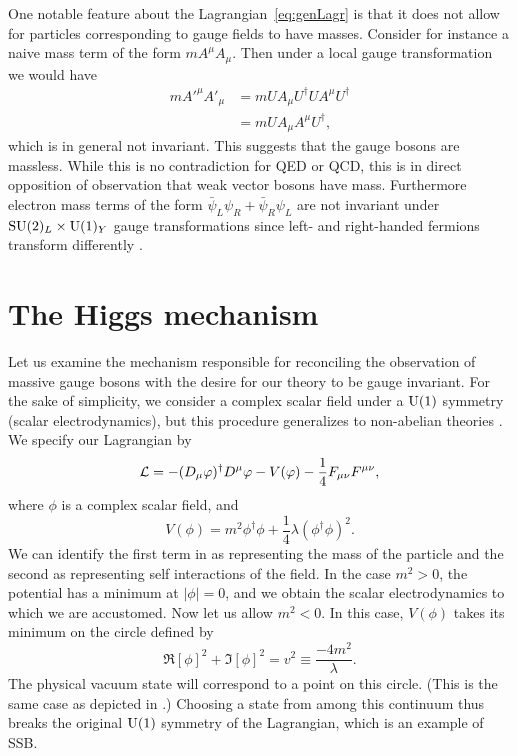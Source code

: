 One notable feature about the Lagrangian~\eqref{eq:genLagr} is that
it does not allow for particles corresponding to gauge fields to have masses.
Consider for instance a naive mass term of the form $mA^{\mu}A_{\mu}$. Then 
under a local gauge transformation we would have
\begin{equation}
  \begin{aligned}
  mA'^{\mu}A'_{\mu}&=mUA_{\mu}U^{\dagger}UA^{\mu}U^{\dagger} \\
                   &=mUA_{\mu}A^{\mu}U^{\dagger},
  \end{aligned}
\end{equation}
which is in general not invariant. This suggests that the gauge bosons are
massless. While this is no contradiction for QED or QCD, this is in direct
opposition of observation that weak vector bosons have mass. Furthermore
electron mass terms of the form $\bar{\psi}_{L}\psi_{R}+
\bar{\psi}_{R}\psi_{L}$ are not invariant under 
$\operatorname{SU}(2)_{L}\times \operatorname{U}(1)_{Y}$ gauge transformations since left- and 
right-handed fermions
transform differently \cite{dittmaier_higgs_2013}.

\section{The Higgs mechanism}

Let us examine the mechanism responsible for reconciling the observation of 
massive gauge bosons with the desire for our theory to be gauge invariant. For 
the sake of simplicity, we consider a complex scalar field under a $\operatorname{U}(1)$ 
symmetry (scalar electrodynamics), but this procedure generalizes to 
non-abelian theories \cite{srednicki_quantum_2007}. 
We specify our Lagrangian by 
\begin{equation}
  \label{eq:HLagr1}
  \mathcal{L}=-(D_{\mu}\varphi)^{\dagger}D^{\mu}\varphi-V(\varphi)
              -\frac{1}{4}F_{\mu\nu}F^{\mu\nu},
\end{equation}
where $\phi$ is a complex scalar field, and
\begin{equation}
  \label{eq:pot}
  V(\phi)=m^{2}\phi^{\dagger}\phi+\frac{1}{4}\lambda(\phi^{\dagger}\phi)^{2}.
\end{equation}
We can identify the first term in  as representing the mass of
the particle and the second as representing self interactions of the field.
In the case $m^2>0$, the potential has a minimum at $|\phi|=0$, and we obtain 
the scalar electrodynamics to which we are accustomed. Now let us allow 
$m^2<0$. In this case, $V(\phi)$ takes its minimum on the circle defined by
\begin{equation}
  \label{eq:v2}
  \Re[\phi]^2+\Im[\phi]^2=v^2\equiv\frac{-4m^2}{\lambda}.
\end{equation}
The physical vacuum state will correspond to a point on this circle. (This
is the same case as depicted in .) Choosing a state 
from among this continuum thus breaks the original
$\operatorname{U}(1)$ symmetry of the Lagrangian, which is an example of SSB. 


